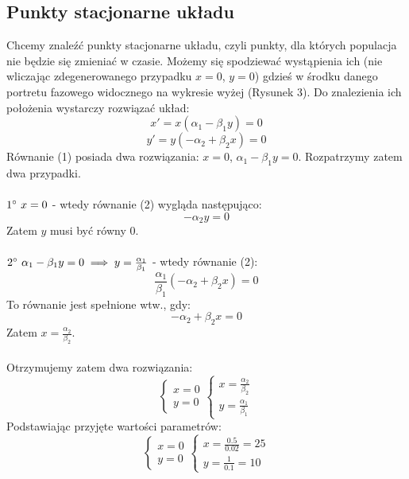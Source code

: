 \documentclass{article}
\begin{document}
\subsection{Punkty stacjonarne układu}
Chcemy znaleźć punkty stacjonarne układu, czyli punkty, dla których populacja nie będzie się zmieniać w czasie. Możemy się spodziewać wystąpienia ich (nie wliczając zdegenerowanego przypadku $x=0$, $y=0$) gdzieś w środku danego portretu fazowego widocznego na wykresie wyżej (Rysunek 3). Do znalezienia ich położenia wystarczy rozwiązać układ:
\begin{equation}
    x' = x(\alpha_1 - \beta_1y) = 0
\end{equation}
\begin{equation}
    y' = y(-\alpha_2 + \beta_2x) = 0
\end{equation}
Równanie (1) posiada dwa rozwiązania: $x=0$, $\alpha_1-\beta_1y=0$. Rozpatrzymy zatem dwa przypadki.
\\\\
$1\degree\ x = 0$ - wtedy równanie (2) wygląda następująco:
$$-\alpha_2y = 0$$
Zatem $y$ musi być równy $0$.
\\\\
$2\degree\ \alpha_1-\beta_1y=0 \implies y = \frac{\alpha_1}{\beta_1}$ - wtedy równanie (2):
$$\frac{\alpha_1}{\beta_1}(-\alpha_2 + \beta_2x) = 0$$
To równanie jest spełnione wtw., gdy:
$$-\alpha_2 + \beta_2x = 0$$
Zatem $x = \frac{\alpha_2}{\beta_2}$.
\\\\
Otrzymujemy zatem dwa rozwiązania:
\begin{equation}
    \begin{cases}
        x = 0 \\
        y = 0
    \end{cases} \nonumber
    \begin{cases}
        x = \frac{\alpha_2}{\beta_2} \\
        y = \frac{\alpha_1}{\beta_1}
    \end{cases} \nonumber
\end{equation}
Podstawiając przyjęte wartości parametrów:
\begin{equation}
    \begin{cases}
        x = 0 \\
        y = 0
    \end{cases} \nonumber
    \begin{cases}
        x = \frac{0.5}{0.02} = 25 \\
        y = \frac{1}{0.1} = 10
    \end{cases} \nonumber
\end{equation}
\end{document}
